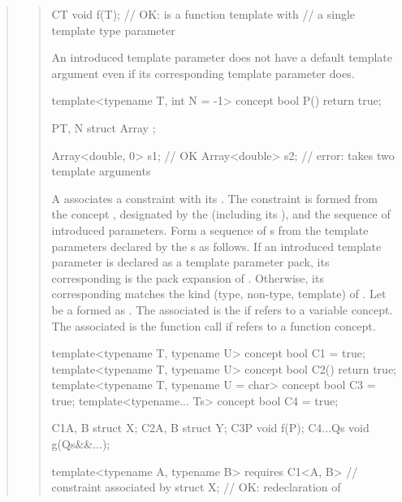 \begin{quote}
\begin{quote}
\begin{codeblock}
C{T} void f(T); // OK:  is a function template with
                // a single template type parameter 
\end{codeblock}
\exitexample

\pnum
An introduced template parameter does not have a default template argument 
even if its corresponding template parameter does.
% 
\enterexample
\begin{codeblock}
template<typename T, int N = -1> concept bool P() { return true; }

P{T, N} struct Array { };

Array<double, 0> s1; // OK
Array<double> s2;    // error:  takes two template arguments
\end{codeblock}
\exitexample


\pnum
A  associates a constraint with its
.
% 
The constraint is formed from the concept , designated by the
 (including its
), 
and the sequence of introduced parameters.
% 
Form a sequence of s
 from the template parameters declared by the
s as follows. 
% 
If an introduced template parameter  is declared as a template 
parameter pack, its corresponding  is the pack
expansion of . 
% 
% 
Otherwise, its corresponding  matches the 
kind (type, non-type, template) of .
% 
Let  be a 
formed as .
% 
The associated  is
the  
if  refers to a variable concept. 
% 
The associated  is
the function call  if  refers to a function 
concept.
% 
\enterexample
\begin{codeblock}
template<typename T, typename U> concept bool C1 = true;
template<typename T, typename U> concept bool C2() { return true; }
template<typename T, typename U = char> concept bool C3 = true;
template<typename... Ts> concept bool C4 = true;

C1{A, B} struct X;
C2{A, B} struct Y;
C3{P} void f(P);
C4{...Qs} void g(Qs&&...);

template<typename A, typename B> 
  requires C1<A, B> // constraint associated by 
    struct X;       // OK: redeclaration of 


\end{codeblock}
\end{quote}
\end{quote}
